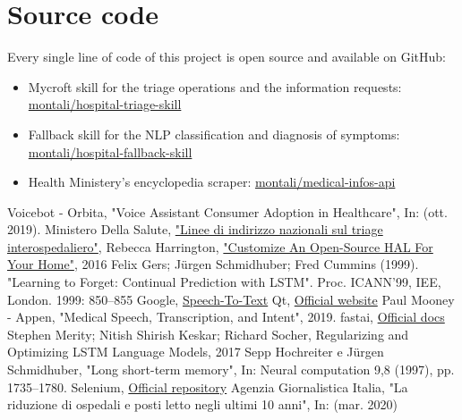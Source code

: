 \documentclass[conference]{IEEEtran}
\begin{document}
\section{Source code}
Every single line of code of this project is open source and available on GitHub:
\begin{itemize}
    \item Mycroft skill for the triage operations and the information requests: \href{https://github.com/montali/hospital-triage-skill}{montali/hospital-triage-skill}
    \item Fallback skill for the NLP classification and diagnosis of symptoms: \href{https://github.com/montali/hospital-fallback-skill}{montali/hospital-fallback-skill}
    \item Health Ministery's encyclopedia scraper: \href{https://github.com/montali/medical-infos-api}{montali/medical-infos-api}
\end{itemize}

\begin{thebibliography}{00}
     Voicebot - Orbita, "Voice Assistant Consumer Adoption in Healthcare", In: (ott. 2019).
     Ministero Della Salute, \href{http://www.salute.gov.it/imgs/C_17_notizie_3849_listaFile_itemName_1_file.pdf}{"Linee di indirizzo nazionali sul triage interospedaliero"},
     Rebecca Harrington, \href{https://www.popsci.com/ultimate-diy-ai/}{"Customize An Open-Source HAL For Your Home"}, 2016
     Felix Gers; Jürgen Schmidhuber; Fred Cummins (1999). "Learning to Forget: Continual Prediction with LSTM". Proc. ICANN'99, IEE, London. 1999: 850–855
     Google, \href{https://cloud.google.com/speech-to-text}{Speech-To-Text}
     Qt, \href{https://www.qt.io/}{Official website}
     Paul Mooney - Appen, "Medical Speech, Transcription, and Intent", 2019.
     fastai, \href{https://docs.fast.ai/}{Official docs}
     Stephen Merity; Nitish Shirish Keskar; Richard Socher, Regularizing and Optimizing LSTM Language Models, 2017
     Sepp Hochreiter e Jürgen Schmidhuber, "Long short-term memory", In: Neural computation 9,8 (1997), pp. 1735–1780.
     Selenium, \href{https://github.com/SeleniumHQ/selenium}{Official repository}
     Agenzia Giornalistica Italia, "La riduzione di ospedali e posti letto negli ultimi 10 anni", In: (mar. 2020)
\end{thebibliography}
\end{document}
